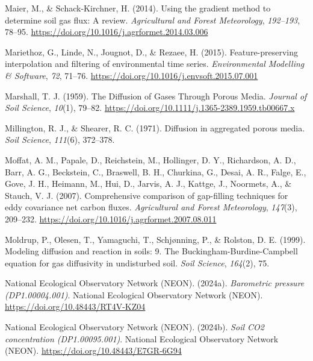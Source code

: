 \documentclass[
  letterpaper,
  DIV=11,
  numbers=noendperiod]{scrartcl}
\newlength{\cslhangindent}
\newenvironment{CSLReferences}[2] %
 {\begin{list}{}{%
  \setlength{\itemindent}{0pt}
  \setlength{\leftmargin}{0pt}
  \setlength{\parsep}{0pt}
  \ifodd #1
   \setlength{\leftmargin}{\cslhangindent}
   \setlength{\itemindent}{-1\cslhangindent}
  \fi
  \setlength{\itemsep}{#2\baselineskip}}}
 {\end{list}}
\begin{document}
\begin{CSLReferences}{1}{0}
Maier, M., \& Schack-Kirchner, H. (2014). Using the gradient method to
determine soil gas flux: {A} review. \emph{Agricultural and Forest
Meteorology}, \emph{192--193}, 78--95.
\url{https://doi.org/10.1016/j.agrformet.2014.03.006}

Mariethoz, G., Linde, N., Jougnot, D., \& Rezaee, H. (2015).
Feature-preserving interpolation and filtering of environmental time
series. \emph{Environmental Modelling \& Software}, \emph{72}, 71--76.
\url{https://doi.org/10.1016/j.envsoft.2015.07.001}

Marshall, T. J. (1959). The {Diffusion} of {Gases Through Porous Media}.
\emph{Journal of Soil Science}, \emph{10}(1), 79--82.
\url{https://doi.org/10.1111/j.1365-2389.1959.tb00667.x}

Millington, R. J., \& Shearer, R. C. (1971). Diffusion in aggregated
porous media. \emph{Soil Science}, \emph{111}(6), 372--378.

Moffat, A. M., Papale, D., Reichstein, M., Hollinger, D. Y., Richardson,
A. D., Barr, A. G., Beckstein, C., Braswell, B. H., Churkina, G., Desai,
A. R., Falge, E., Gove, J. H., Heimann, M., Hui, D., Jarvis, A. J.,
Kattge, J., Noormets, A., \& Stauch, V. J. (2007). Comprehensive
comparison of gap-filling techniques for eddy covariance net carbon
fluxes. \emph{Agricultural and Forest Meteorology}, \emph{147}(3),
209--232. \url{https://doi.org/10.1016/j.agrformet.2007.08.011}

Moldrup, P., Olesen, T., Yamaguchi, T., Schjønning, P., \& Rolston, D.
E. (1999). Modeling diffusion and reaction in soils: 9. {The
Buckingham-Burdine-Campbell} equation for gas diffusivity in undisturbed
soil. \emph{Soil Science}, \emph{164}(2), 75.

National Ecological Observatory Network (NEON). (2024a).
\emph{Barometric pressure ({DP1}.00004.001)}. National Ecological
Observatory Network (NEON). \url{https://doi.org/10.48443/RT4V-KZ04}

National Ecological Observatory Network (NEON). (2024b). \emph{Soil
{CO2} concentration ({DP1}.00095.001)}. National Ecological Observatory
Network (NEON). \url{https://doi.org/10.48443/E7GR-6G94}


\end{CSLReferences}
\end{document}
